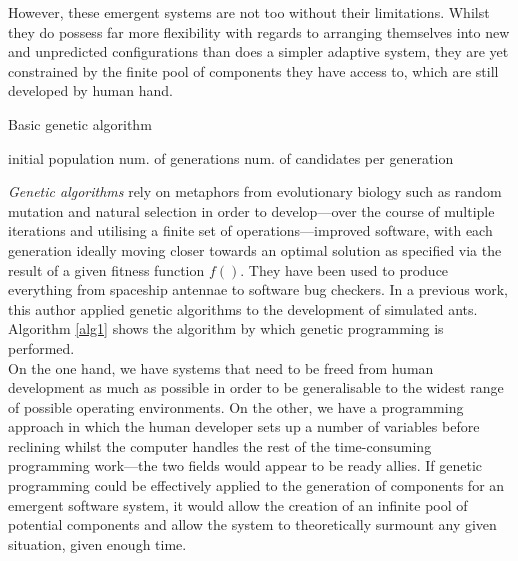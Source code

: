\documentclass[compsoc,12pt,a4paper]{IEEEtran}
\begin{document}
		However, these emergent systems are not too without their limitations. Whilst they do possess far more flexibility with regards to arranging themselves into new and unpredicted configurations than does a simpler adaptive system, they are yet constrained by the finite pool of components they have access to, which are still developed by human hand.\\
		\begin{algorithm}
			\caption{Basic genetic algorithm}
			\label{alg1}
			\begin{algorithmic}
				\REQUIRE initial population
				\REQUIRE num. of generations
				\REQUIRE num. of candidates per generation
					\ENDFOR
					\ENDFOR
						\ENDIF
					\ENDFOR
				\ENDFOR
			\end{algorithmic}
		\end{algorithm}
		\textit{Genetic algorithms} rely on metaphors from evolutionary biology such as random mutation and natural selection in order to develop---over the course of multiple iterations and utilising a finite set of operations---improved software, with each generation ideally moving closer towards an optimal solution as specified via the result of a given fitness function $f\left(\right)$. They have been used to produce everything from spaceship antennae\cite{antenna} to software bug checkers.\cite{genprog} In a previous work,\cite{ants} this author applied genetic algorithms to the development of simulated ants. Algorithm \ref{alg1} shows the algorithm by which genetic programming is performed.\\
		On the one hand, we have systems that need to be freed from human development as much as possible in order to be generalisable to the widest range of possible operating environments. On the other, we have a programming approach in which the human developer sets up a number of variables before reclining whilst the computer handles the rest of the time-consuming programming work---the two fields would appear to be ready allies. If genetic programming could be effectively applied to the generation of components for an emergent software system, it would allow the creation of an infinite pool of potential components and allow the system to theoretically surmount any given situation, given enough time.\\
\end{document}
